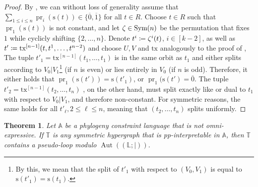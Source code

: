 \documentclass[a4paper,reqno, cleveref]{amsart}
\newcommand{\coloneqq}{\mathrel{\mathop:}\mathrel{\mkern-1.2mu}=}
\newtheorem{theorem}{Theorem}[section]
\newcommand{\br}[1]{[#1]}
\newcommand{\struct}[1]{\mathbb{#1}}
\newcommand{\s}{\ensuremath{\mathrm{s}}\xspace}
\DeclareMathOperator{\pr}{pr}
\DeclareMathOperator{\Aut}{Aut}
\newcommand{\sA}{\mathbb A}
\newcommand{\sT}{\mathbb T}
\newcommand{\nested}[2]{{#1^{[#2]}}}
\newcommand{\Phylo}[1]{\ensuremath{(\struct{L};|)}#1}
\newcommand{\tx}{\ensuremath{\mathrm{tx}}\xspace}
\newcommand{\hyp}{\ensuremath{R}\xspace}
\begin{document}
\begin{proof}
    By , we can without loss of generality assume that $\sum_{1\leq i\leq n}\pr_i(\s(t))\in\{\overline 0,\overline 1\}$ for all $t\in\hyp$. 
    Choose $t\in\hyp$ such that $\pr_1(\s(t))$ is not constant, and let $\zeta\in\textnormal{Sym}(n)$ be the permutation that fixes $1$ while cyclicly shifting $\{2,\dots,n\}$.
    Denote $t^i\coloneqq\zeta^{i}(t)$, $i\in\br{k-2}$, as well as $t'\coloneqq \nested{\tx}{n-1}(t,t^1,\ldots,t^{n-2})$ and choose $U, V$ and $\tx$ analogously to the proof of , 
    The tuple $t'_1=\nested{\tx}{n-1}(t_1,\ldots,t_1)$
    is in the same orbit as $t_1$ and either splits according to $V_0|V_1$\footnote{By this, we mean that the split of $t'_1$ with respect to $(V_0,V_1)$ is equal to $\s(t'_1)=\s(t_1)$.} (if $n$ is even) or lies entirely in $V_0$ (if $n$ is odd).
    Therefore, it either holds that $\pr_1(\s(t'))=\s(t'_1)$, or $\pr_1(\s(t')=\overline{0}$.
    The tuple $t'_2=\nested{\tx}{n-1}(t_2,\ldots,t_n)$
    , on the other hand, must split exactly like or dual to $t_1$ with respect to $V_0|V_1$, and therefore non-constant. 
   For symmetric reasons,  the same holds for all  $t'_\ell, 2\leq\ell\leq n$, meaning that
   $(t_2,\ldots,t_n)$ splits uniformly.
\end{proof}



\begin{theorem}\label{phylo:theorem:hyp:pseudoloop} Let $\sA$ be a phylogeny constraint language  that is not omni-expressive. If $\sT$ is any symmetric
hypergraph that is pp-interpretable in $\sA$, then  $\sT$ contains a pseudo-loop modulo $\Aut(\Phylo)$.
\end{theorem}
\end{document}
